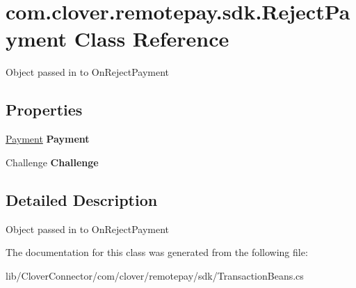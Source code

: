 \hypertarget{classcom_1_1clover_1_1remotepay_1_1sdk_1_1_reject_payment}{}\section{com.\+clover.\+remotepay.\+sdk.\+Reject\+Payment Class Reference}
\label{classcom_1_1clover_1_1remotepay_1_1sdk_1_1_reject_payment}


Object passed in to On\+Reject\+Payment  


\subsection*{Properties}
\begin{DoxyCompactItemize}
\item 
\mbox{\label{classcom_1_1clover_1_1remotepay_1_1sdk_1_1_reject_payment_af2f407d26380d55c9c9a53258ab63f3e}} 
\hyperlink{classcom_1_1clover_1_1sdk_1_1v3_1_1payments_1_1_payment}{Payment} {\bfseries Payment}
\item 
\mbox{\label{classcom_1_1clover_1_1remotepay_1_1sdk_1_1_reject_payment_aca8efd480294c897b18376fef8a8bb48}} 
Challenge {\bfseries Challenge}
\end{DoxyCompactItemize}


\subsection{Detailed Description}
Object passed in to On\+Reject\+Payment 



The documentation for this class was generated from the following file\+:\begin{DoxyCompactItemize}
\item 
lib/\+Clover\+Connector/com/clover/remotepay/sdk/Transaction\+Beans.\+cs\end{DoxyCompactItemize}
